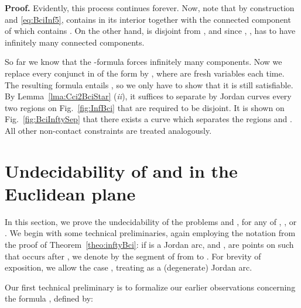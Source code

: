 \documentclass{article}
\newcommand{\qedsymbol}{\ding{113}}
\newenvironment{proof}{\par\noindent\textbf{Proof.}}{\mbox{}\hfill\qedsymbol\par\bigskip}
\begin{document}
\begin{proof}
 Evidently, this process continues forever. Now, note that by
 construction and \eqref{eq:BciInf5},  contains in its
 interior  together with the connected component 
 of  which contains . On the other hand,
  is disjoint from , and since , ,
  has to have infinitely many connected components.

So far we know that the -formula  forces
infinitely many components.  Now we replace every conjunct in
 of the form  by ,
where  are fresh variables each time. The resulting formula
entails , so we only have to show that it is still
satisfiable. By Lemma~\ref{lma:Cci2BciStar} (\emph{ii}), it suffices
to separate by Jordan curves every two regions on
Fig.~\ref{fig:InfBci} that are required to be disjoint. It is shown on
Fig.~\ref{fig:BciInftySep} that there exists a curve which separates
the regions  and . All other non-contact constraints
are treated analogously.
\end{proof}

\section{Undecidability of \cBc{} and \cBCc{} in the Euclidean plane}
\label{sec:UndecidabilityB}
In this section, we prove the undecidability of the problems
 and , for  any of
, ,  or . We begin with some technical
preliminaries, again employing the notation from the proof of
Theorem~\ref{theo:inftyBci}: if  is a Jordan arc, and , 
are points on  such that  occurs after , we denote by
 the segment of  from  to . For brevity of
exposition, we allow the case , treating  as a
(degenerate) Jordan arc.

Our first technical preliminary is to formalize our earlier observations
concerning the formula ,
defined by:
\end{document}
